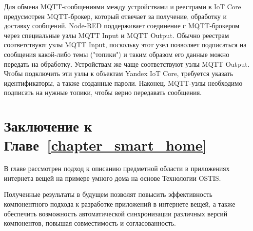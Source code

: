 Для обмена MQTT-сообщениями между устройствами и реестрами в IoT Core предусмотрен MQTT-брокер, который отвечает за получение, обработку и доставку сообщений. Node-RED поддерживает соединение с MQTT-брокером через специальные узлы MQTT Input и MQTT Output. Обычно реестрам соответствуют узлы MQTT Input, поскольку этот узел позволяет подписаться на сообщения какой-либо темы ("топики"{}) и таким образом его данные можно передать на обработку. Устройствам же чаще соответствуют узлы MQTT Output. Чтобы подключить эти узлы к объектам Yandex IoT Core, требуется указать идентификаторы, а также созданные пароли. Наконец, MQTT-узлы необходимо подписать на нужные топики, чтобы верно передавать сообщения.

\section*{Заключение к Главе~\ref{chapter_smart_home}}

В главе рассмотрен подход к описанию предметной области в приложениях интернета вещей на примере умного дома на основе Технологии OSTIS.

Полученные результаты в будущем позволят повысить эффективность компонентного подхода к разработке приложений в интернете вещей, а также обеспечить возможность автоматической синхронизации различных версий компонентов, повышая совместимость и согласованность.